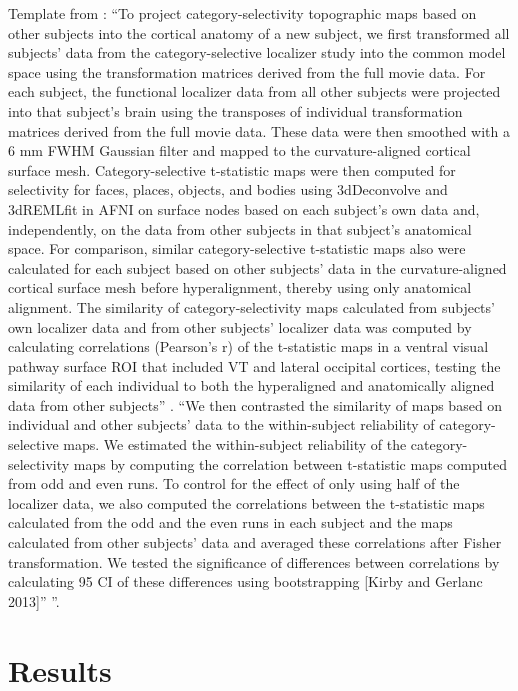 %
Template from \citet{guntupalli2016model}: ``To project category-selectivity
topographic maps based on other subjects into the cortical anatomy of a new
subject, we first transformed all subjects' data from the category-selective
localizer study into the common model space using the transformation matrices
derived from the full movie data. For each subject, the functional localizer
data from all other subjects were projected into that subject's brain using the
transposes of individual transformation matrices derived from the full movie
data. These data were then smoothed with a 6 mm FWHM Gaussian filter and mapped
to the curvature-aligned cortical surface mesh. Category-selective t-statistic
maps were then computed for selectivity for faces, places, objects, and bodies
using 3dDeconvolve and 3dREMLﬁt in AFNI on surface nodes based on each subject's
own data and, independently, on the data from other subjects in that subject's
anatomical space. For comparison, similar category-selective t-statistic maps
also were calculated for each subject based on other subjects' data in the
curvature-aligned cortical surface mesh before hyperalignment, thereby using
only anatomical alignment. The similarity of category-selectivity maps
calculated from subjects' own localizer data and from other subjects' localizer
data was computed by calculating correlations (Pearson's r) of the t-statistic
maps in a ventral visual pathway surface ROI that included VT and lateral
occipital cortices, testing the similarity of each individual to both the
hyperaligned and anatomically aligned data from other subjects''
\citep{guntupalli2016model}.
%
``We then contrasted the similarity of maps based on individual and other
subjects' data to the within-subject reliability of category-selective maps. We
estimated the within-subject reliability of the category-selectivity maps by
computing the correlation between t-statistic maps computed from odd and even
runs. To control for the effect of only using half of the localizer data, we
also computed the correlations between the t-statistic maps calculated from the
odd and the even runs in each subject and the maps calculated from other
subjects' data and averaged these correlations after Fisher transformation. We
tested the significance of differences between correlations by calculating 95%
CI of these differences using bootstrapping [Kirby and Gerlanc 2013]''
\citep{guntupalli2016model}''.


\section{Results}


